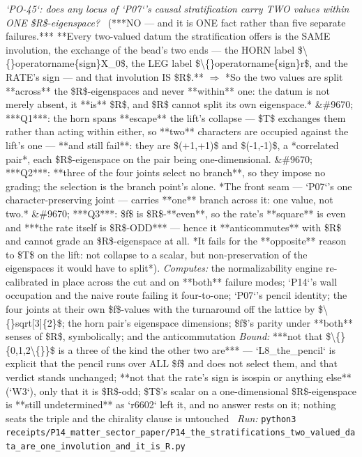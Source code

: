 \begin{description}
\textit{`PO-45`: does any locus of `P07`'s causal stratification carry TWO values within ONE \$R\$-eigenspace?} \ (***NO --- and it is ONE fact rather than five separate failures.*** **Every two-valued datum the stratification offers is the SAME involution, the exchange of the bead's two ends --- the HORN label \$\textbackslash\{\}operatorname\{sign\}X\_0\$, the LEG label \$\textbackslash\{\}operatorname\{sign\}r\$, and the RATE's sign --- and that involution IS \$R\$.** \ensuremath{\Rightarrow} *So the two values are split **across** the \$R\$-eigenspaces and never **within** one: the datum is not merely absent, it **is** \$R\$, and \$R\$ cannot split its own eigenspace.* \&\#9670; ***Q1***: the horn spans **escape** the lift's collapse --- \$T\$ exchanges them rather than acting within either, so **two** characters are occupied against the lift's one --- **and still fail**: they are \$(+1,+1)\$ and \$(-1,-1)\$, a *correlated pair*, each \$R\$-eigenspace on the pair being one-dimensional. \&\#9670; ***Q2***: **three of the four joints select no branch**, so they impose no grading; the selection is the branch point's alone. *The front seam --- `P07`'s one character-preserving joint --- carries **one** branch across it: one value, not two.* \&\#9670; ***Q3***: \$f\$ is \$R\$-**even**, so the rate's **square** is even and ***the rate itself is \$R\$-ODD*** --- hence it **anticommutes** with \$R\$ and cannot grade an \$R\$-eigenspace at all. *It fails for the **opposite** reason to \$T\$ on the lift: not collapse to a scalar, but non-preservation of the eigenspaces it would have to split*). 
\emph{Computes:} the normalizability engine re-calibrated in place across the cut and on **both** failure modes; `P14`'s wall occupation and the naive route failing it four-to-one; `P07`'s pencil identity; the four joints at their own \$f\$-values with the turnaround off the lattice by \$\textbackslash\{\}sqrt[3]\{2\}\$; the horn pair's eigenspace dimensions; \$f\$'s parity under **both** senses of \$R\$, symbolically; and the anticommutation
 \emph{Bound:}  ***not that \$\textbackslash\{\}\{0,1,2\textbackslash\{\}\}\$ is a three of the kind the other two are*** --- `L8\_the\_pencil` is explicit that the pencil runs over ALL \$f\$ and does not select them, and that verdict stands unchanged; **not that the rate's sign is isospin or anything else** (`W3`), only that it is \$R\$-odd; \$T\$'s scalar on a one-dimensional \$R\$-eigenspace is **still undetermined** as `r6602` left it, and no answer rests on it; nothing seats the triple and the chirality clause is untouched
\ \emph{Run:} \texttt{python3 receipts/P14\_matter\_sector\_paper/P14\_the\_stratifications\_two\_valued\_data\_are\_one\_involution\_and\_it\_is\_R.py}

\end{description}
